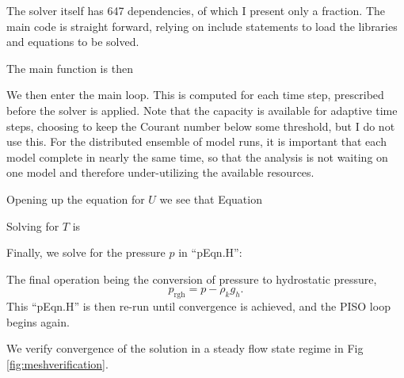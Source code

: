 \documentclass[10pt,letterpaper]{article}
\begin{document}
The solver itself has 647 dependencies, of which I present only a fraction.
The main code is straight forward, relying on include statements to load the libraries and equations to be solved.



The main function is then



We then enter the main loop.
This is computed for each time step, prescribed before the solver is applied.
Note that the capacity is available for adaptive time steps, choosing to keep the Courant number below some threshold, but I do not use this.
For the distributed ensemble of model runs, it is important that each model complete in nearly the same time, so that the analysis is not waiting on one model and therefore under-utilizing the available resources.



Opening up the equation for $U$ we see that Equation



Solving for $T$ is 



Finally, we solve for the pressure $p$ in ``pEqn.H'':



The final operation being the conversion of pressure to hydrostatic pressure,
\begin{equation*} p _\text{rgh} = p - \rho _k g_h . \end{equation*}
This ``pEqn.H'' is then re-run until convergence is achieved, and the PISO loop begins again.

We verify convergence of the solution in a steady flow state regime in Fig \ref{fig:meshverification}.
\end{document}
